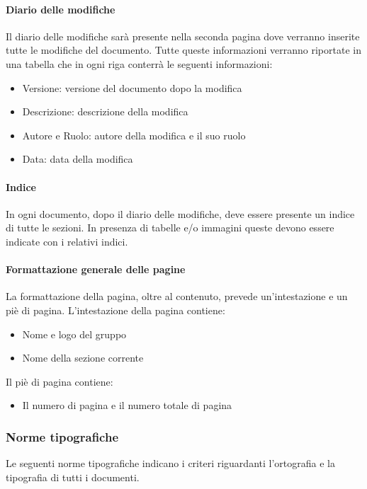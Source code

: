 \paragraph{Diario delle modifiche }

Il diario delle modifiche sarà presente nella seconda pagina dove verranno inserite tutte le modifiche del documento. Tutte queste informazioni verranno riportate in una tabella che in ogni riga conterrà le seguenti informazioni:
\begin{itemize}
\item  Versione: versione del documento dopo la modifica
\item  Descrizione: descrizione della modifica
\item  Autore e Ruolo: autore della modifica e il suo ruolo
\item  Data: data della modifica
\end{itemize}
\paragraph{Indice}

In ogni documento, dopo il diario delle modifiche, deve essere presente un indice di tutte le
sezioni. In presenza di tabelle e/o immagini queste devono essere indicate con i relativi indici.

\paragraph{Formattazione generale delle pagine}

La formattazione della pagina, oltre al contenuto, prevede un'intestazione e un piè di pagina.
L'intestazione della pagina contiene:
\begin{itemize}
\item Nome e logo del gruppo
\item Nome della sezione corrente
\end{itemize}

Il piè di pagina contiene:
\begin{itemize} 
\item Il numero di pagina e il numero totale di pagina
\end{itemize}

\subsubsection{Norme tipografiche}

Le seguenti norme tipografiche indicano i criteri riguardanti l'ortografia e la tipografia di tutti i documenti.

